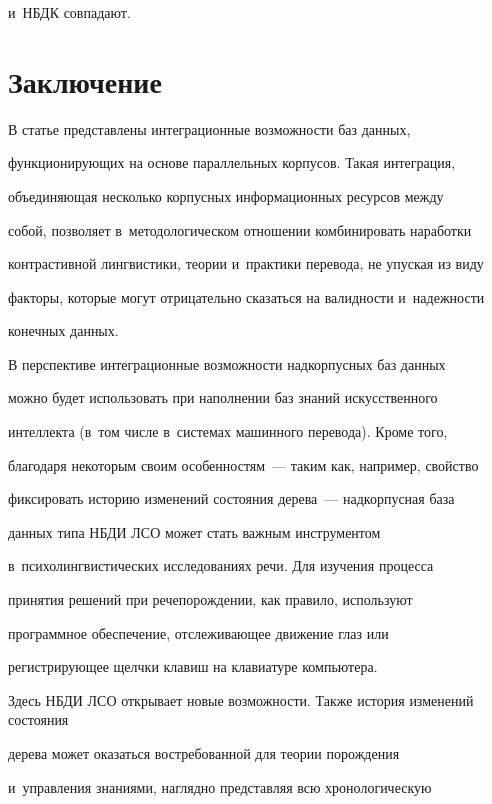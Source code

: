 и~НБДК совпадают.


  


  \section{Заключение}


  


  В статье представлены интеграционные возможности баз данных, 


функционирующих на основе параллельных корпусов. Такая интеграция, 


объединяющая несколько корпусных информационных ресурсов между 


собой, позволяет в~методологическом отношении комбинировать наработки 


контрастивной лингвистики, теории и~практики перевода, не упуская из виду 


факторы, которые могут отрицательно сказаться на валидности и~надежности 


конечных данных.


  


  В перспективе интеграционные возможности надкорпусных баз данных 


можно будет использовать при наполнении баз знаний искусственного 


интеллекта (в~том числе в~системах машинного перевода). Кроме того, 


благодаря некоторым своим особенностям~--- таким как, например, свойство 


фиксировать историю изменений состояния дерева~--- надкорпусная база 


данных типа НБДИ ЛСО может стать важным инструментом 


в~психолингвистических исследованиях речи. Для изучения процесса 


принятия решений при речепорождении, как правило, используют 


программное обеспечение, отслеживающее движение глаз или 


регистрирующее щелчки клавиш на клавиатуре компьютера. 


Здесь НБДИ ЛСО  открывает новые возможности. Также история изменений состояния 


дерева может оказаться востребованной для теории порождения 


и~управления знаниями, наглядно представляя всю хронологическую 


